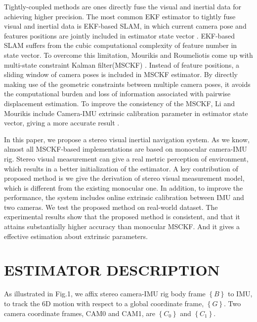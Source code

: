 \documentclass[a4paper, 10pt, conference]{ieeeconf}      %
\begin{document}
Tightly-coupled methods are ones directly fuse the visual and inertial data for achieving higher precision. The most common EKF estimator to tightly fuse visual and inertial data is EKF-based SLAM, in which current camera pose and features positions are jointly included in estimator state vector \cite{jones2011visual} \cite{kelly2011visual}. EKF-based SLAM suffers from the cubic computational complexity of feature number in state  vector. To overcome this limitation, Mourikis and Roumeliotis come up with multi-state constraint Kalman filter(MSCKF) \cite{mourikis2007multi}. Instead of feature positions, a sliding window of camera poses is included in MSCKF estimator. By directly making use of the geometric constraints between multiple camera poses, it avoids the computational burden and loss of information associated with pairwise displacement estimation. To improve the consistency of the MSCKF, Li and Mourikis include Camera-IMU extrinsic calibration parameter in estimator state vector, giving a more accurate result \cite{li2013high}. 

In this paper, we propose a stereo visual inertial navigation system. As we know, almost all MSCKF-based implementations are based on monocular camera-IMU rig. Stereo visual measurement can give a real metric perception of   environment, which results in a better initialization of the estimator. A key contribution of proposed method is we give the derivation of stereo visual measurement model, which is different from the existing monocular one. In addition, to improve the performance, the system includes online extrinsic calibration between IMU and two cameras. We test the proposed method on real-world dataset. The experimental results show that the proposed method is consistent, and that it attains substantially higher accuracy than monocular MSCKF. And it gives a effective estimation about extrinsic parameters.


\section{ESTIMATOR DESCRIPTION}

As illustrated in Fig.1, we affix stereo camera-IMU rig body frame $\left\lbrace B \right\rbrace$ to IMU, to track the 6D motion with respect to a global coordinate frame, $\left\lbrace G \right\rbrace$.  Two camera coordinate frames, CAM0 and CAM1, are $\left\lbrace C_0 \right\rbrace$ and $\left\lbrace C_1 \right\rbrace$.
\end{document}

